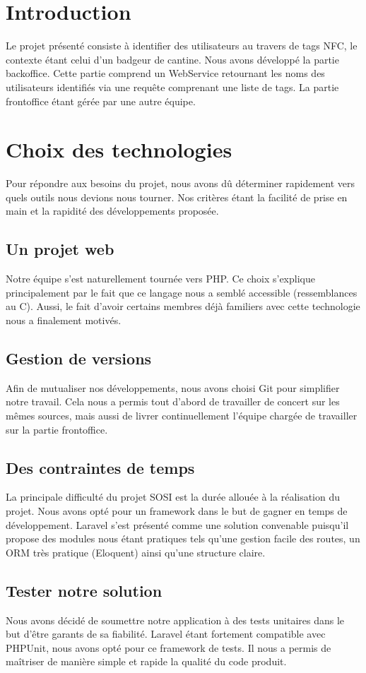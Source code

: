 \chapter*{Introduction}

Le projet présenté consiste à identifier des utilisateurs au travers de tags NFC, le
contexte étant celui d'un badgeur de cantine. Nous avons développé la partie backoffice.
Cette partie comprend un WebService retournant les noms des utilisateurs identifiés via
une requête comprenant une liste de tags. La partie frontoffice étant gérée par une autre équipe.

\chapter{Choix des technologies}

Pour répondre aux besoins du projet, nous avons dû déterminer rapidement vers quels outils
nous devions nous tourner. Nos critères étant la facilité de prise en main et la rapidité
des développements proposée.

\section{Un projet web}

Notre équipe s'est naturellement tournée vers PHP. Ce choix s'explique principalement par le fait
que ce langage nous a semblé accessible (ressemblances au C). Aussi, le fait d'avoir certains
membres déjà familiers avec cette technologie nous a finalement motivés.

\section{Gestion de versions}

Afin de mutualiser nos développements, nous avons choisi Git pour simplifier notre
travail. Cela nous a permis tout d'abord de travailler de concert sur les mêmes sources,
mais aussi de livrer continuellement l'équipe chargée de travailler sur la partie frontoffice.

\section{Des contraintes de temps}

La principale difficulté du projet SOSI est la durée allouée à la réalisation du projet.
Nous avons opté pour un framework dans le but de gagner en temps de développement. Laravel
s'est présenté comme une solution convenable puisqu'il propose des modules nous étant pratiques
tels qu'une gestion facile des routes, un ORM très pratique (Eloquent) ainsi qu'une structure
claire.

\section{Tester notre solution}

Nous avons décidé de soumettre notre application à des tests unitaires dans le but d'être garants de sa fiabilité. Laravel étant fortement compatible avec PHPUnit, nous avons opté pour ce framework de tests. Il nous a permis de maîtriser de manière simple et rapide la qualité du code produit.

